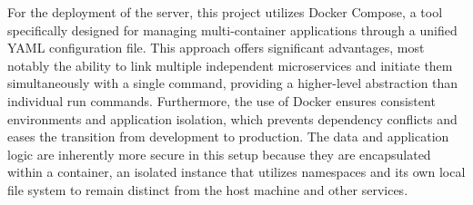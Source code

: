 For the deployment of the server, this project utilizes Docker Compose, a tool specifically designed for managing multi-container applications through a unified YAML configuration file. This approach offers significant advantages, most notably the ability to link multiple independent microservices and initiate them simultaneously with a single command, providing a higher-level abstraction than individual run commands. Furthermore, the use of Docker ensures consistent environments and application isolation, which prevents dependency conflicts and eases the transition from development to production. The data and application logic are inherently more secure in this setup because they are encapsulated within a container, an isolated instance that utilizes namespaces and its own local file system to remain distinct from the host machine and other services. \autocite[3--5,13,28--29,34--36, 77--81]{jangla2018accelerating}

